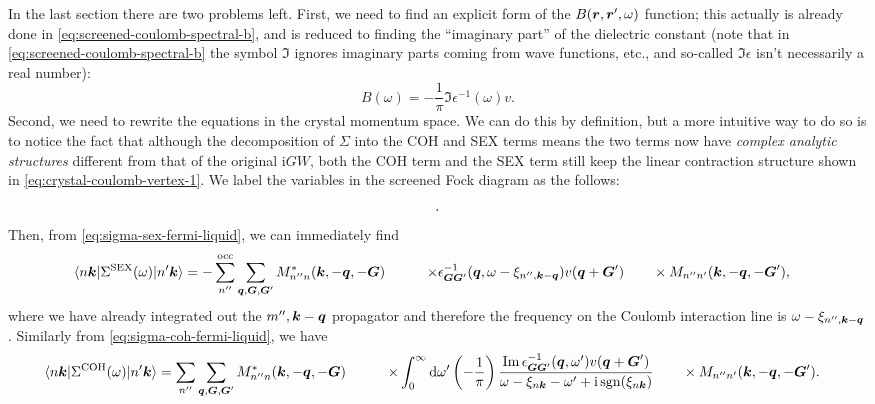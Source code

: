 \documentclass[hyperref, a4paper, 12pt]{report}
\DeclareMathOperator{\sgn}{sgn}
\newcommand*{\ii}{\mathrm{i}}
\def\\{}%
\begin{document}
In the last section there are two problems left.
First, we need to find an explicit form of the $B(\vb*{r}, \vb*{r}', \omega)$ function;
this actually is already done in \eqref{eq:screened-coulomb-spectral-b}, 
and is reduced to finding the ``imaginary part'' of the dielectric constant
(note that in \eqref{eq:screened-coulomb-spectral-b}
the symbol $\Im$ ignores imaginary parts coming from wave functions, etc., 
and so-called $\Im \epsilon$ isn't necessarily a real number): 
\begin{equation}
    B(\omega) = - \frac{1}{\pi} \Im \epsilon^{-1}(\omega) v.
\end{equation}
Second, we need to rewrite the equations in the 
crystal momentum space. 
We can do this by definition,
but a more intuitive way to do so 
is to notice the fact that although 
the decomposition of $\Sigma$ into the COH and SEX terms 
means the two terms now have \emph{complex analytic structures} 
different from that of the original $\ii G W$,
both the COH term and the SEX term 
still keep the linear contraction structure 
shown in \eqref{eq:crystal-coulomb-vertex-1}.
We label the variables in the screened Fock diagram as the follows: 
\[
    \protect.
\]
Then, from \eqref{eq:sigma-sex-fermi-liquid}, 
we can immediately find 
\begin{equation}
    \begin{aligned}
        \mel{n \vb*{k}}{\Sigma^{\text{SEX}}(\omega)}{n' \vb*{k}}
        &= - \sum_{n''}^{\text{occ}} \sum_{\vb*{q}, \vb*{G}, \vb*{G}'}
        M^*_{n'' n} (\vb*{k}, - \vb*{q}, - \vb*{G})  \\
        &\quad\quad \times  \epsilon^{-1}_{\vb*{G} \vb*{G}'}(\vb*{q}, \omega - \xi_{n'', \vb*{k} - \vb*{q}}) 
        v(\vb*{q} + \vb*{G}') \\
        &\quad\quad \times M_{n'' n'} (\vb*{k}, - \vb*{q},  -\vb*{G}'),
    \end{aligned}
\end{equation}
where we have already integrated out the $m'', \vb*{k} - \vb*{q}$ propagator 
and therefore the frequency on the Coulomb interaction line 
is $\omega - \xi_{n'', \vb*{k} - \vb*{q}}$.
Similarly from \eqref{eq:sigma-coh-fermi-liquid}, we have 
\begin{equation}
    \begin{aligned}
        \mel{n \vb*{k}}{\Sigma^{\text{COH}}(\omega)}{n' \vb*{k}}
        &= \sum_{n''} \sum_{\vb*{q}, \vb*{G}, \vb*{G}'}
        M^*_{n'' n} (\vb*{k}, - \vb*{q}, - \vb*{G})   \\
        &\quad \quad \times \int_{0}^{\infty} \dd{\omega'} 
        \left(
            - \frac{1}{\pi}
        \right)
        \frac{
            \Im \epsilon^{-1}_{\vb*{G} \vb*{G}'} (\vb*{q}, \omega') v(\vb*{q}+\vb*{G}')
        }{\omega - \xi_{n \vb*{k}} - \omega' + \ii \sgn(\xi_{n \vb*{k}})} \\
        &\quad \quad \times M_{n'' n'} (\vb*{k}, - \vb*{q},  -\vb*{G}').
    \end{aligned}
    \label{eq:sigma-coh-fermi-liquid-eps-1}
\end{equation}
\end{document}
